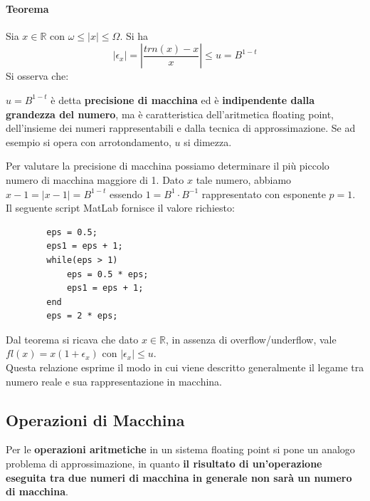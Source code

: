 \documentclass[10pt]{book}
\begin{document}
\paragraph{Teorema} Sia $x \in \mathbb{R}$ con $\omega \leq |x| \leq \Omega$. Si ha $$|\epsilon_x| = |\frac{trn(x) - x}{x}| \leq u = B^{1-t}$$
Si osserva che:
\begin{list}{}{}
	\item $u = B^{1-t}$ è detta \textbf{precisione di macchina} ed è \textbf{indipendente dalla grandezza del numero}, ma è caratteristica dell'aritmetica floating point, dell'insieme dei numeri rappresentabili e dalla tecnica di approssimazione. Se ad esempio si opera con arrotondamento, $u$ si dimezza.
	\item Per valutare la precisione di macchina possiamo determinare il più piccolo numero di macchina maggiore di 1. Dato $x$ tale numero, abbiamo $x - 1 = |x - 1| = B^{1-t}$ essendo $1 = B^1 \cdot B^{-1}$ rappresentato con esponente $p = 1$. Il seguente script MatLab fornisce il valore richiesto:
	\begin{lstlisting}
		eps = 0.5;
		eps1 = eps + 1;
		while(eps > 1)
			eps = 0.5 * eps;
			eps1 = eps + 1;
		end
		eps = 2 * eps;
	\end{lstlisting}
	\item Dal teorema si ricava che dato $x \in \mathbb{R}$, in assenza di overflow/underflow, vale $fl(x) = x(1 + \epsilon_x)$ con $|\epsilon_x| \leq u$.\\
	Questa relazione esprime il modo in cui viene descritto generalmente il legame tra numero reale e sua rappresentazione in macchina.
\end{list}
\subsection{Operazioni di Macchina}
Per le \textbf{operazioni aritmetiche} in un sistema floating point si pone un analogo problema di approssimazione, in quanto \textbf{il risultato di un'operazione eseguita tra due numeri di macchina in generale non sarà un numero di macchina}.
\end{document}
